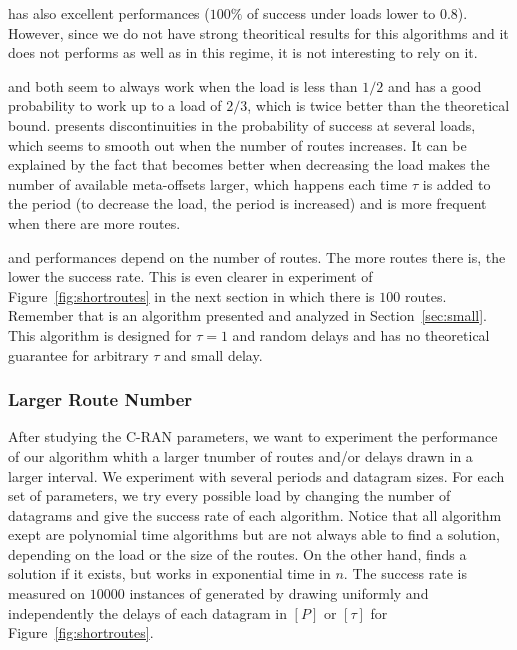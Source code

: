        \firstfit has also excellent performances ($100\%$ of success under loads lower to $0.8$). However, since we do not have strong theoritical results for this algorithms and it does not performs as well as \shortestlongest in this regime, it is not interesting to rely on it.

      \metaoffset and \greedyuniform both seem to always work when the load is less than $1/2$ and has a good probability to work up to a load of $2/3$, which is twice better than the theoretical bound. \metaoffset presents discontinuities in the probability of success at several loads, which seems to smooth out when the number of routes increases. It can be explained by the fact that \metaoffset becomes better when decreasing the load makes the number of available meta-offsets larger, which happens each time $\tau$ is added to the period (to decrease the load, the period is increased) and is more frequent when there are more routes.
      
      \greedyuniform and \metaoffset performances depend on the number of routes. The more routes there is, the lower the success rate. This is even clearer in experiment of Figure~\ref{fig:shortroutes} in the next section in which there is $100$ routes. Remember that \greedyuniform is an algorithm presented and analyzed in Section~\ref{sec:small}. This algorithm is designed for $\tau = 1$ and random delays and has no theoretical guarantee for arbitrary $\tau$ and small delay.
     



\subsubsection{Larger Route Number}\label{sec:pazlmanyroutes} 

After studying the C-RAN parameters, we want to experiment the performance of our algorithm whith a larger tnumber of routes and/or delays drawn in a larger interval.
We experiment with several periods and datagram sizes. For each set of parameters, we try every possible load by changing the number of datagrams and give the success rate of each algorithm. Notice that all algorithm exept \ESCA are polynomial time algorithms but are not always able to find a solution, depending on the load or the size of the routes. On the other hand, \ESCA finds a solution if it exists, but works in exponential time in $n$.
 The success rate is measured on $10000$ instances of \pma generated by drawing uniformly and independently the delays of each datagram in $[P]$ or $[\tau]$ for Figure~\ref{fig:shortroutes}. 


